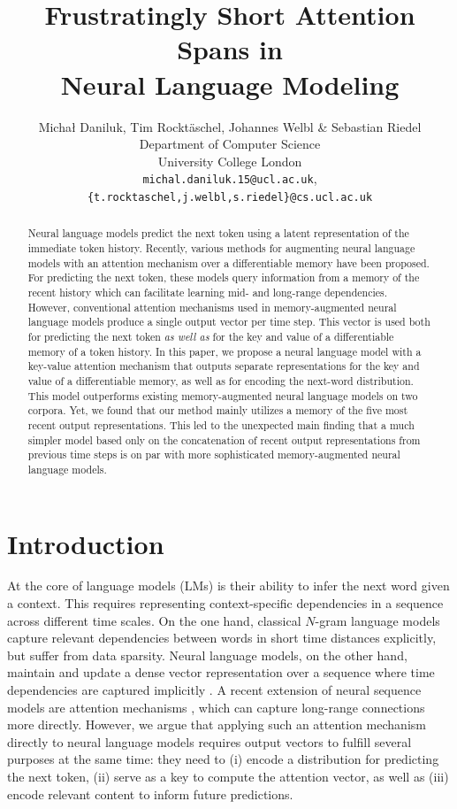 \documentclass{article}
\title{Frustratingly Short Attention Spans in\\ Neural Language Modeling}
\author{Michał Daniluk, Tim Rockt\"aschel, Johannes Welbl \& Sebastian Riedel\\
Department of Computer Science\\
University College London\\
\texttt{michal.daniluk.15@ucl.ac.uk},\\
\texttt{\{t.rocktaschel,j.welbl,s.riedel\}@cs.ucl.ac.uk} \\
}
\begin{document}
  



\maketitle
\begin{abstract}
Neural language models predict the next token using a latent representation of the immediate token history.
Recently, various methods for augmenting neural language models with an attention mechanism over a differentiable memory have been proposed.
For predicting the next token, these models query information from a memory of the recent history which can facilitate learning mid- and long-range dependencies.
However, conventional attention mechanisms used in memory-augmented neural language models produce a single output vector per time step.
This vector is used both for predicting the next token \emph{as well as} for the key and value of a differentiable memory of a token history. 
In this paper, we propose a neural language model with a key-value attention mechanism that outputs separate representations for the key and value of a differentiable memory, as well as for encoding the next-word distribution.
This model outperforms existing memory-augmented neural language models on two corpora.
Yet, we found that our method mainly utilizes a memory of the five most recent output representations. 
This led to the unexpected main finding that a much simpler model based only on the concatenation of recent output representations from previous time steps is on par with more sophisticated memory-augmented neural language models.
\end{abstract}

\section{Introduction}

At the core of language models (LMs) is their ability to infer the next word given a context. 
This requires representing context-specific dependencies in a sequence across different time scales.
On the one hand, classical $N$-gram language models capture relevant dependencies between words in short time distances explicitly, but suffer from data sparsity.
Neural language models, on the other hand, maintain and update a dense vector representation over a sequence where time dependencies are captured implicitly \citep{MIK10}.
A recent extension of neural sequence models are attention mechanisms \citep{bahdanau2014neural}, which can capture long-range connections more directly.
However, we argue that applying such an attention mechanism directly to neural language models requires output vectors to fulfill several purposes at the same time: 
they need to
(i) encode a distribution for predicting the next token,
(ii) serve as a key to compute the attention vector, as well as 
(iii) encode relevant content to inform future predictions.
\end{document}
